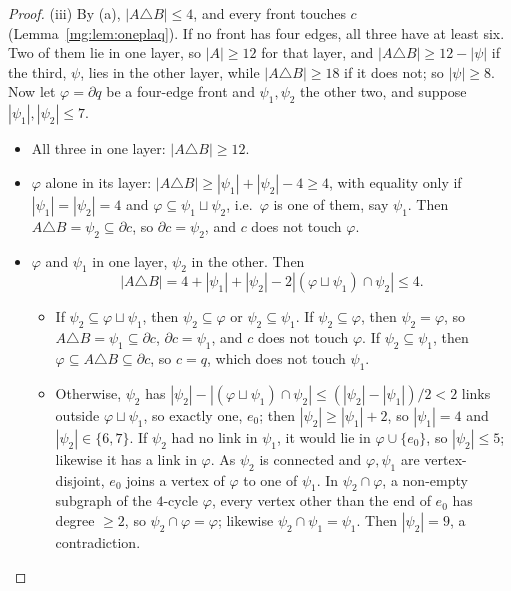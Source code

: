 \documentclass[11pt,a4paper]{article}
\theoremstyle{definition}
\theoremstyle{remark}
\begin{document}
\begin{proof}
(iii) By (a), $|A\triangle B|\le4$, and every front touches $c$ (Lemma~\ref{mg:lem:oneplaq}). If no front has four edges, all three have at least six. Two of
them lie in one layer, so $|A|\ge12$ for that layer, and $|A\triangle B|\ge12-|\psi|$ if the third, $\psi$, lies in the other layer, while $|A\triangle B|\ge18$ if it does not;
so $|\psi|\ge8$. Now let $\varphi=\partial q$ be a four-edge front and $\psi_1,\psi_2$ the other two, and suppose $|\psi_1|,|\psi_2|\le7$.
\begin{itemize}
\item All three in one layer: $|A\triangle B|\ge12$.
\item $\varphi$ alone in its layer: $|A\triangle B|\ge|\psi_1|+|\psi_2|-4\ge4$, with equality only if $|\psi_1|=|\psi_2|=4$ and $\varphi\subseteq\psi_1\sqcup\psi_2$, i.e.\ $\varphi$ is
one of them, say $\psi_1$. Then $A\triangle B=\psi_2\subseteq\partial c$, so $\partial c=\psi_2$, and $c$ does not touch $\varphi$.
\item $\varphi$ and $\psi_1$ in one layer, $\psi_2$ in the other. Then
\[
|A\triangle B|=4+|\psi_1|+|\psi_2|-2|(\varphi\sqcup\psi_1)\cap\psi_2|\le4 .
\]
\begin{itemize}
\item If $\psi_2\subseteq\varphi\sqcup\psi_1$, then $\psi_2\subseteq\varphi$ or $\psi_2\subseteq\psi_1$. If $\psi_2\subseteq\varphi$, then $\psi_2=\varphi$, so $A\triangle B=\psi_1\subseteq\partial c$,
$\partial c=\psi_1$, and $c$ does not touch $\varphi$. If $\psi_2\subseteq\psi_1$, then $\varphi\subseteq A\triangle B\subseteq\partial c$, so $c=q$, which does not touch $\psi_1$.
\item Otherwise, $\psi_2$ has $|\psi_2|-|(\varphi\sqcup\psi_1)\cap\psi_2|\le(|\psi_2|-|\psi_1|)/2<2$ links outside $\varphi\sqcup\psi_1$, so exactly one, $e_0$; then
$|\psi_2|\ge|\psi_1|+2$, so $|\psi_1|=4$ and $|\psi_2|\in\{6,7\}$. If $\psi_2$ had no link in $\psi_1$, it would lie in $\varphi\cup\{e_0\}$, so $|\psi_2|\le5$; likewise it
has a link in $\varphi$. As $\psi_2$ is connected and $\varphi,\psi_1$ are vertex-disjoint, $e_0$ joins a vertex of $\varphi$ to one of $\psi_1$. In $\psi_2\cap\varphi$, a non-empty
subgraph of the $4$-cycle $\varphi$, every vertex other than the end of $e_0$ has degree $\ge2$, so $\psi_2\cap\varphi=\varphi$; likewise $\psi_2\cap\psi_1=\psi_1$. Then
$|\psi_2|=9$, a contradiction.
\end{itemize}
\end{itemize}


\end{proof}
\end{document}
